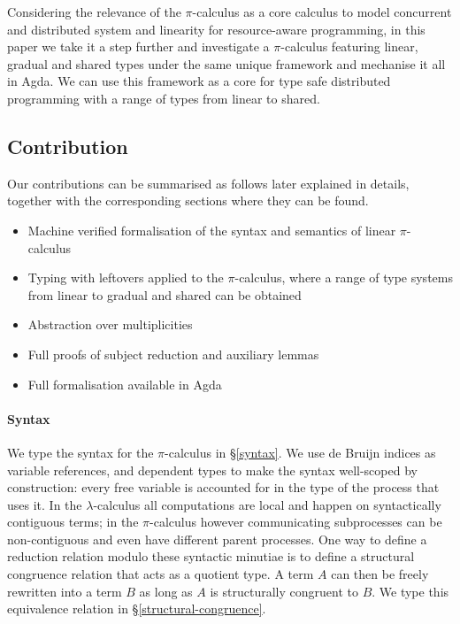 \documentclass[a4paper,UKenglish,cleveref, autoref, thm-restate,authorcolumns]{lipics-v2019}
\theoremstyle{definition}
\newcommand{\lambdacalc}{$\lambda$-calculus}
\newcommand{\picalc}{$\pi$-calculus}
\begin{document}
Considering the relevance of the \picalc{} as a core calculus to model concurrent and distributed system and linearity for resource-aware programming, in this paper we take it a step further and investigate a \picalc{} featuring linear, gradual and shared types under the same unique framework and mechanise it all in Agda.
We can use this framework as a core for type safe distributed programming with a range of types from linear to shared.

\subsection{Contribution}
Our contributions can be summarised as follows later explained in details, together with the corresponding sections where they can be found.
\begin{itemize}
  \item Machine verified formalisation of the syntax and semantics of linear \picalc{}

  \item Typing with leftovers applied to the \picalc{}, where a range of type systems from linear to gradual and shared can be obtained

  \item Abstraction over multiplicities

  \item Full proofs of subject reduction and auxiliary lemmas

  \item Full formalisation available in Agda
\end{itemize}

\paragraph*{Syntax}
We type the syntax for the \picalc{} in \S \ref{syntax}.
We use de Bruijn indices \cite{} as variable references, and dependent types to make the syntax well-scoped by construction: every free variable is accounted for in the type of the process that uses it.
In the \lambdacalc{} all computations are local and happen on syntactically contiguous terms; in the \picalc{} however communicating subprocesses can be non-contiguous and even have different parent processes.
One way to define a reduction relation modulo these syntactic minutiae is to define a structural congruence \cite{} relation that acts as a quotient type.
A term $A$ can then be freely rewritten into a term $B$ as long as $A$ is structurally congruent to $B$.
We type this equivalence relation in \S \ref{structural-congruence}.
\end{document}
